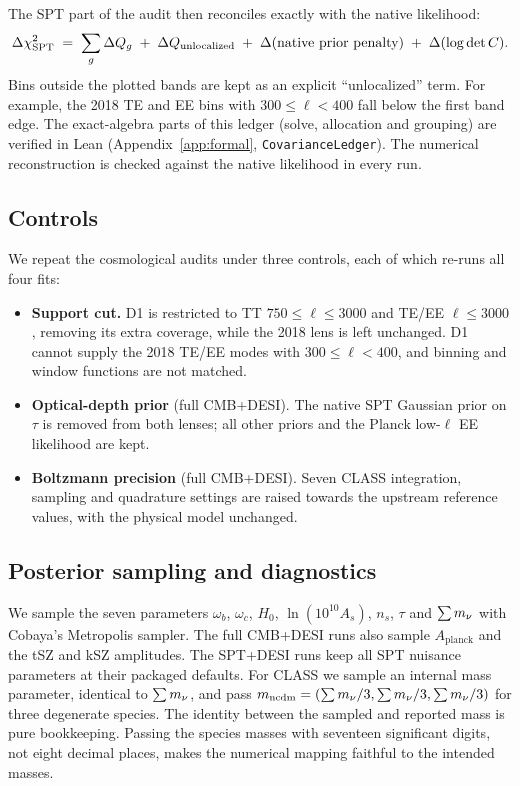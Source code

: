 The SPT part of the audit then reconciles exactly with the native likelihood:
\begin{equation}
  \Delta \chi^2_{\mathrm{SPT}} \;=\; \sum_g\Delta Q_g \;+\; \Delta Q_{\mathrm{unlocalized}} \;+\; \Delta(\text{native prior penalty}) \;+\; \Delta(\log\det C).
  \label{eq:ledger}
\end{equation}
Bins outside the plotted bands are kept as an explicit ``unlocalized'' term. For example, the 2018 TE and EE bins with $300\le\ell<400$ fall below the first band edge. The exact-algebra parts of this ledger (solve, allocation and grouping) are verified in Lean (Appendix~\ref{app:formal}, \texttt{CovarianceLedger}). The numerical reconstruction is checked against the native likelihood in every run.

\subsection{Controls}
\label{sec:common-staging}
We repeat the cosmological audits under three controls, each of which re-runs all four fits:
\begin{itemize}[leftmargin=*, itemsep=2pt]
  \item \textbf{Support cut.} D1 is restricted to TT $750\le\ell\le3000$ and TE/EE $\ell\le3000$, removing its extra coverage, while the 2018 lens is left unchanged. D1 cannot supply the 2018 TE/EE modes with $300\le\ell<400$, and binning and window functions are not matched.
  \item \textbf{Optical-depth prior} (full CMB+DESI). The native SPT Gaussian prior on $\tau$ is removed from both lenses; all other priors and the Planck low-$\ell$ EE likelihood are kept.
  \item \textbf{Boltzmann precision} (full CMB+DESI). Seven CLASS integration, sampling and quadrature settings are raised towards the upstream reference values, with the physical model unchanged.
\end{itemize}

\subsection{Posterior sampling and diagnostics}
\label{sec:mnu-inference}

We sample the seven parameters $\omega_b$, $\omega_c$, $H_0$, $\ln(10^{10}A_s)$, $n_s$, $\tau$ and $\sum m_\nu$ with Cobaya's Metropolis sampler. The full CMB+DESI runs also sample $A_{\mathrm{planck}}$ and the tSZ and kSZ amplitudes. The SPT+DESI runs keep all SPT nuisance parameters at their packaged defaults. For CLASS we sample an internal mass parameter, identical to $\sum m_\nu$, and pass $m_{\mathrm{ncdm}}=(\sum m_\nu/3,\sum m_\nu/3,\sum m_\nu/3)$ for three degenerate species. The identity between the sampled and reported mass is pure bookkeeping. Passing the species masses with seventeen significant digits, not eight decimal places, makes the numerical mapping faithful to the intended masses.

